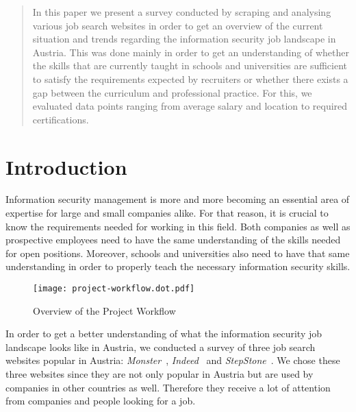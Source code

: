 \documentclass[runningheads]{llncs}
\begin{document}

\maketitle

\vspace{8em}

\begin{abstract}

In this paper we present a survey conducted by scraping and analysing various job search websites in order to get an overview of the current situation and trends regarding the information security job landscape in Austria. This was done mainly in order to get an understanding of whether the skills that are currently taught in schools and universities are sufficient to satisfy the requirements expected by recruiters or whether there exists a gap between the curriculum and professional practice. For this, we evaluated data points ranging from average salary and location to required certifications.


\end{abstract}

\newpage

\section{Introduction}
\label{sec:introduction}

Information security management is more and more becoming an essential area of expertise for large and small companies alike. For that reason, it is crucial to know the requirements needed for working in this field. Both companies as well as prospective employees need to have the same understanding of the skills needed for open positions. Moreover, schools and universities also need to have that same understanding in order to properly teach the necessary information security skills.

\begin{figure}[H]
	\centering
  \texttt{[image: project-workflow.dot.pdf]}
	\caption{Overview of the Project Workflow}
	\label{fig:project_workflow}
\end{figure}

In order to get a better understanding of what the information security job landscape looks like in Austria, we conducted a survey of three job search websites popular in Austria: \textit{Monster}~\cite{monster}, \textit{Indeed}~\cite{indeed} and \textit{StepStone}~\cite{stepstone}. We chose these three websites since they are not only popular in Austria but are used by companies in other countries as well. Therefore they receive a lot of attention from companies and people looking for a job.
\end{document}

